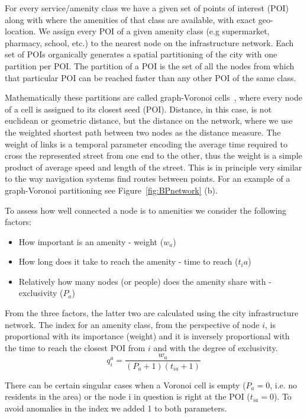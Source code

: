 For every service/amenity class we have a given set of points of interest (POI) along with where the amenities of that class are available, with exact geo-location. We assign every POI of a given amenity class (e.g supermarket, pharmacy, school, etc.) to the nearest node on the infrastructure network. Each set of POIs organically generates a spatial partitioning of the city with one partition per POI. The partition of a POI is the set of all the nodes from which that particular POI can be reached faster than any other POI of the same class.

Mathematically these partitions are called graph-Voronoi cells~\cite{Erwig2000Graph,Deritei2014Community}, where every node of a cell is assigned to its closest seed (POI). Distance, in this case, is not euclidean or geometric distance, but the distance on the network, where we use the weighted shortest path between two nodes as the distance measure. The weight of links is a temporal parameter encoding the average time required to cross the represented street from one end to the other, thus the weight is a simple product of average speed and length of the street. This is in principle very similar to the way navigation systems find routes between points. For an example of a graph-Voronoi partitioning see Figure~\ref{fig:BPnetwork} (b).

To assess how well connected a node is to amenities we consider the following factors:
\begin{itemize}
	\item How important is an amenity - weight ($w_a$)
	\item How long does it take to reach the amenity - time to reach ($t_ia$)
	\item Relatively how many nodes (or people) does the amenity share with - exclusivity ($P_a$)
\end{itemize}

From the three factors, the latter two are calculated using the city infrastructure network. The index for an amenity class, from the perspective of node $i$, is proportional with its importance (weight) and it is inversely proportional with the time to reach the closest POI from $i$ and with the degree of exclusivity.
\begin{equation}\label{q_i}
	q_i^a=\frac{w_{a}}{(P_a+1)(t_{ia}+1)}
\end{equation}

There can be certain singular cases when a Voronoi cell is empty ($P_a=0$, i.e. no residents in the area) or the node i in question is right at the POI ($t_{ia}=0$). To avoid anomalies in the index we added 1 to both parameters.


